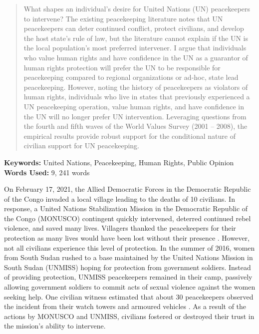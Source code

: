 \documentclass[12pt]{article}
\begin{document}
\begin{abstract}
\begin{singlespace}
What shapes an individual’s desire for United Nations (UN) peacekeepers to intervene? The existing peacekeeping literature notes that UN peacekeepers can deter continued conflict, protect civilians, and develop the host state’s rule of law, but the literature cannot explain if the UN is the local population's most preferred intervener. I argue that individuals who value human rights and have confidence in the UN as a guarantor of human rights protection will prefer the UN to be responsible for peacekeeping compared to regional organizations or ad-hoc, state lead peacekeeping. However, noting the history of peacekeepers as violators of human rights, individuals who live in states that previously experienced a UN peacekeeping operation, value human rights, and have confidence in the UN will no longer prefer UN intervention. Leveraging questions from the fourth and fifth waves of the World Values Survey (2001 – 2008), the empirical results provide robust support for the conditional nature of civilian support for UN peacekeeping.
\end{singlespace}
\end{abstract}
\begin{center}
\textbf{Keywords:} United Nations, Peacekeeping, Human Rights, Public Opinion \\
\textbf{Words Used:} 9, 241 words
\end{center}



\newpage

On February 17, 2021, the Allied Democratic Forces in the Democratic Republic of the Congo invaded a local village leading to the deaths of 10 civilians. In response, a United Nations Stabilization Mission in the Democratic Republic of the Congo (MONUSCO) contingent quickly intervened, deterred continued rebel violence, and saved many lives. Villagers thanked the peacekeepers for their protection as many lives would have been lost without their presence \citep{BBC_2021}. However, not all civilians experience this level of protection. In the summer of 2016, women from South Sudan rushed to a base maintained by the United Nations Mission in South Sudan (UNMISS) hoping for protection from government soldiers. Instead of providing protection, UNMISS peacekeepers remained in their camp, passively allowing government soldiers to commit acts of sexual violence against the women seeking help. One civilian witness estimated that about 30 peacekeepers observed the incident from their watch towers and armoured vehicles \citep{patinkin_2016}. As a result of the actions by MONUSCO and UNMISS, civilians fostered or destroyed their trust in the mission's ability to intervene.
\end{document}
